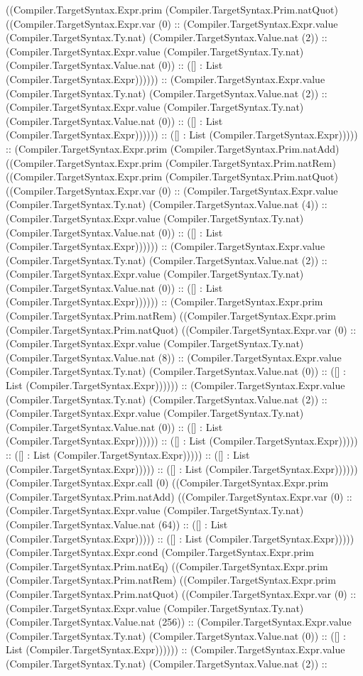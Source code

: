 \documentclass[11pt]{article}
\begin{document}
((Compiler.TargetSyntax.Expr.prim (Compiler.TargetSyntax.Prim.natQuot) ((Compiler.TargetSyntax.Expr.var (0) :: (Compiler.TargetSyntax.Expr.value (Compiler.TargetSyntax.Ty.nat) (Compiler.TargetSyntax.Value.nat (2)) :: (Compiler.TargetSyntax.Expr.value (Compiler.TargetSyntax.Ty.nat) (Compiler.TargetSyntax.Value.nat (0)) :: ([] : List (Compiler.TargetSyntax.Expr)))))) :: (Compiler.TargetSyntax.Expr.value (Compiler.TargetSyntax.Ty.nat) (Compiler.TargetSyntax.Value.nat (2)) :: (Compiler.TargetSyntax.Expr.value (Compiler.TargetSyntax.Ty.nat) (Compiler.TargetSyntax.Value.nat (0)) :: ([] : List (Compiler.TargetSyntax.Expr)))))) :: ([] : List (Compiler.TargetSyntax.Expr))))) :: (Compiler.TargetSyntax.Expr.prim (Compiler.TargetSyntax.Prim.natAdd) ((Compiler.TargetSyntax.Expr.prim (Compiler.TargetSyntax.Prim.natRem) ((Compiler.TargetSyntax.Expr.prim (Compiler.TargetSyntax.Prim.natQuot) ((Compiler.TargetSyntax.Expr.var (0) :: (Compiler.TargetSyntax.Expr.value (Compiler.TargetSyntax.Ty.nat) (Compiler.TargetSyntax.Value.nat (4)) :: (Compiler.TargetSyntax.Expr.value (Compiler.TargetSyntax.Ty.nat) (Compiler.TargetSyntax.Value.nat (0)) :: ([] : List (Compiler.TargetSyntax.Expr)))))) :: (Compiler.TargetSyntax.Expr.value (Compiler.TargetSyntax.Ty.nat) (Compiler.TargetSyntax.Value.nat (2)) :: (Compiler.TargetSyntax.Expr.value (Compiler.TargetSyntax.Ty.nat) (Compiler.TargetSyntax.Value.nat (0)) :: ([] : List (Compiler.TargetSyntax.Expr)))))) :: (Compiler.TargetSyntax.Expr.prim (Compiler.TargetSyntax.Prim.natRem) ((Compiler.TargetSyntax.Expr.prim (Compiler.TargetSyntax.Prim.natQuot) ((Compiler.TargetSyntax.Expr.var (0) :: (Compiler.TargetSyntax.Expr.value (Compiler.TargetSyntax.Ty.nat) (Compiler.TargetSyntax.Value.nat (8)) :: (Compiler.TargetSyntax.Expr.value (Compiler.TargetSyntax.Ty.nat) (Compiler.TargetSyntax.Value.nat (0)) :: ([] : List (Compiler.TargetSyntax.Expr)))))) :: (Compiler.TargetSyntax.Expr.value (Compiler.TargetSyntax.Ty.nat) (Compiler.TargetSyntax.Value.nat (2)) :: (Compiler.TargetSyntax.Expr.value (Compiler.TargetSyntax.Ty.nat) (Compiler.TargetSyntax.Value.nat (0)) :: ([] : List (Compiler.TargetSyntax.Expr)))))) :: ([] : List (Compiler.TargetSyntax.Expr))))) :: ([] : List (Compiler.TargetSyntax.Expr))))) :: ([] : List (Compiler.TargetSyntax.Expr))))) :: ([] : List (Compiler.TargetSyntax.Expr)))))) (Compiler.TargetSyntax.Expr.call (0) ((Compiler.TargetSyntax.Expr.prim (Compiler.TargetSyntax.Prim.natAdd) ((Compiler.TargetSyntax.Expr.var (0) :: (Compiler.TargetSyntax.Expr.value (Compiler.TargetSyntax.Ty.nat) (Compiler.TargetSyntax.Value.nat (64)) :: ([] : List (Compiler.TargetSyntax.Expr))))) :: ([] : List (Compiler.TargetSyntax.Expr))))) (Compiler.TargetSyntax.Expr.cond (Compiler.TargetSyntax.Expr.prim (Compiler.TargetSyntax.Prim.natEq) ((Compiler.TargetSyntax.Expr.prim (Compiler.TargetSyntax.Prim.natRem) ((Compiler.TargetSyntax.Expr.prim (Compiler.TargetSyntax.Prim.natQuot) ((Compiler.TargetSyntax.Expr.var (0) :: (Compiler.TargetSyntax.Expr.value (Compiler.TargetSyntax.Ty.nat) (Compiler.TargetSyntax.Value.nat (256)) :: (Compiler.TargetSyntax.Expr.value (Compiler.TargetSyntax.Ty.nat) (Compiler.TargetSyntax.Value.nat (0)) :: ([] : List (Compiler.TargetSyntax.Expr)))))) :: (Compiler.TargetSyntax.Expr.value (Compiler.TargetSyntax.Ty.nat) (Compiler.TargetSyntax.Value.nat (2)) :: 
\end{document}
